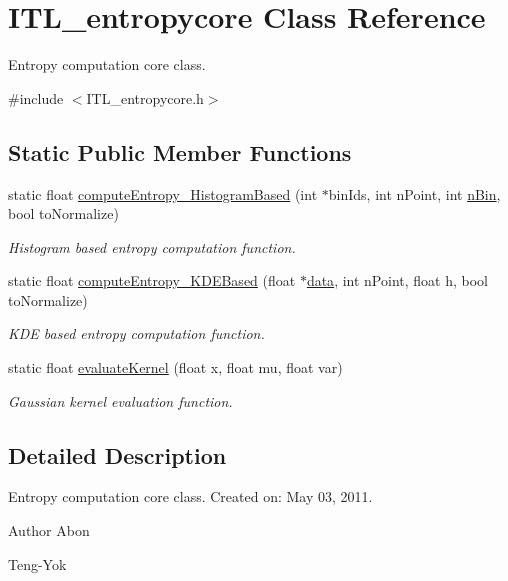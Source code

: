 \hypertarget{classITL__entropycore}{
\section{ITL\_\-entropycore Class Reference}
\label{classITL__entropycore}
}


Entropy computation core class.  




{\ttfamily \#include $<$ITL\_\-entropycore.h$>$}

\subsection*{Static Public Member Functions}
\begin{DoxyCompactItemize}
\item 
static float \hyperlink{classITL__entropycore_afd605a02922df607f43d0b1ec3248e7d}{computeEntropy\_\-HistogramBased} (int $\ast$binIds, int nPoint, int \hyperlink{MainIT__regvector_8cpp_a7f13753d4707f6bc8f71d8bdacedefb3}{nBin}, bool toNormalize)
\begin{DoxyCompactList}\small\item\em Histogram based entropy computation function. \item\end{DoxyCompactList}\item 
static float \hyperlink{classITL__entropycore_a44a6bc62c22f739825a4b7dcf10ab43a}{computeEntropy\_\-KDEBased} (float $\ast$\hyperlink{MainIT__regvector_8cpp_a783b2b1c03f80ec0d3ed965238d6bd65}{data}, int nPoint, float h, bool toNormalize)
\begin{DoxyCompactList}\small\item\em KDE based entropy computation function. \item\end{DoxyCompactList}\item 
static float \hyperlink{classITL__entropycore_a5802a6a76dba25a5afa2b232eb69b9c2}{evaluateKernel} (float x, float mu, float var)
\begin{DoxyCompactList}\small\item\em Gaussian kernel evaluation function. \item\end{DoxyCompactList}\end{DoxyCompactItemize}


\subsection{Detailed Description}
Entropy computation core class. Created on: May 03, 2011. \begin{DoxyAuthor}{Author}
Abon 

Teng-\/Yok 
\end{DoxyAuthor}


